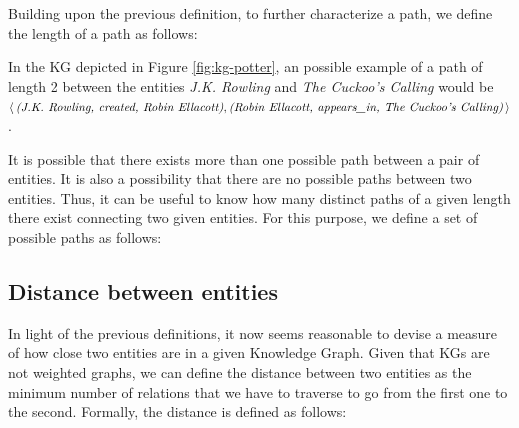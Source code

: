 
Building upon the previous definition, to further characterize a path, we define the length of a path as follows:


In the KG depicted in Figure \ref{fig:kg-potter}, an possible example of a path of length 2 between the entities \textit{J.K. Rowling} and \textit{The Cuckoo's Calling} would be $\langle\, \textit{(J.K. Rowling, created, Robin Ellacott)}, \textit{(Robin Ellacott, appears\_in, The Cuckoo's Calling)}\,\rangle$.

It is possible that there exists more than one possible path between a pair of entities. It is also a possibility that there are no possible paths between two entities. Thus, it can be useful to know how many distinct paths of a given length there exist connecting two given entities. For this purpose, we define a set of possible paths as follows:


\subsection{Distance between entities}
In light of the previous definitions, it now seems reasonable to devise a measure of how close two entities are in a given Knowledge Graph. Given that KGs are not weighted graphs, we can define the distance between two entities as the minimum number of relations that we have to traverse to go from the first one to the second. Formally, the distance is defined as follows:

